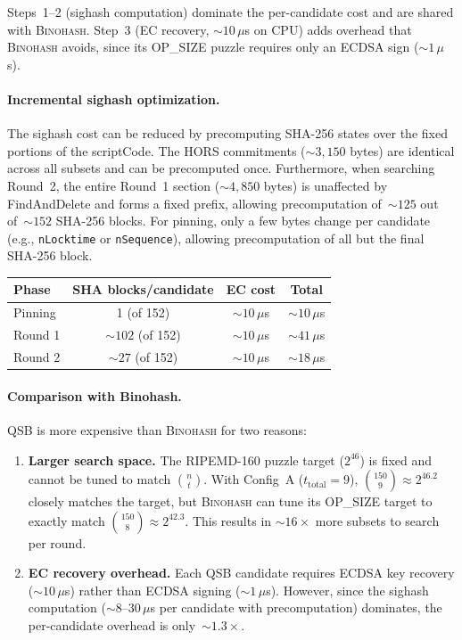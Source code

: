 \documentclass[11pt, a4paper]{article}
\begin{document}
Steps~1--2 (sighash computation) dominate the per-candidate cost and are shared with \textsc{Binohash}. Step~3 (EC recovery, ${\sim}10\,\mu$s on CPU) adds overhead that \textsc{Binohash} avoids, since its OP\_SIZE puzzle requires only an ECDSA sign (${\sim}1\,\mu$s).

\paragraph{Incremental sighash optimization.}
The sighash cost can be reduced by precomputing SHA-256 states over the fixed portions of the scriptCode. The HORS commitments (${\sim}3{,}150$ bytes) are identical across all subsets and can be precomputed once. Furthermore, when searching Round~2, the entire Round~1 section (${\sim}4{,}850$ bytes) is unaffected by FindAndDelete and forms a fixed prefix, allowing precomputation of~${\sim}125$ out of~${\sim}152$ SHA-256 blocks. For pinning, only a few bytes change per candidate (e.g., \texttt{nLocktime} or \texttt{nSequence}), allowing precomputation of all but the final SHA-256 block.

\begin{center}
\small
\begin{tabular}{lccc}
\toprule
\textbf{Phase} & \textbf{SHA blocks/candidate} & \textbf{EC cost} & \textbf{Total} \\
\midrule
Pinning & 1 (of 152) & ${\sim}10\,\mu$s & ${\sim}10\,\mu$s \\
Round 1 & ${\sim}102$ (of 152) & ${\sim}10\,\mu$s & ${\sim}41\,\mu$s \\
Round 2 & ${\sim}27$ (of 152) & ${\sim}10\,\mu$s & ${\sim}18\,\mu$s \\
\bottomrule
\end{tabular}
\end{center}

\paragraph{Comparison with Binohash.}
QSB is more expensive than \textsc{Binohash} for two reasons:

\begin{enumerate}
    \item \textbf{Larger search space.} The RIPEMD-160 puzzle target ($2^{46}$) is fixed and cannot be tuned to match $\binom{n}{t}$. With Config~A ($t_{\mathrm{total}} = 9$), $\binom{150}{9} \approx 2^{46.2}$ closely matches the target, but \textsc{Binohash} can tune its OP\_SIZE target to exactly match $\binom{150}{8} \approx 2^{42.3}$. This results in ${\sim}16\times$ more subsets to search per round.

    \item \textbf{EC recovery overhead.} Each QSB candidate requires ECDSA key recovery (${\sim}10\,\mu$s) rather than ECDSA signing (${\sim}1\,\mu$s). However, since the sighash computation (${\sim}8$--$30\,\mu$s per candidate with precomputation) dominates, the per-candidate overhead is only~${\sim}1.3\times$.
\end{enumerate}
\end{document}

